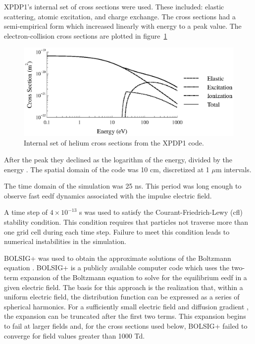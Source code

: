 XPDP1's internal set of cross sections were used. These included: elastic
scattering, atomic excitation, and charge exchange. The cross sections had a
semi-empirical form which increased linearly with energy to a peak value. The
electron-collision cross sections are plotted in figure~\ref{fig:xsecs}
\begin{figure}
  \centering
  \includegraphics{./chapters/modeling/figures/xsecs.eps}
  \caption{Internal set of helium cross sections from the XPDP1 code.}
  \label{fig:xsecs}
\end{figure}
After the peak they declined as the logarithm of the energy, divided by the
energy \cite{Verboncoeur1993}. The spatial domain of the code was 10 cm,
discretized at 1 $\mu$m intervals.

The time domain of the simulation was 25 ns.
This period was long enough to observe fast \acs{eedf} dynamics associated with
the impulse electric field.

A time step of $4\times10^{-13}$ s was used to
satisfy the Courant-Friedrich-Lewy (\acs{cfl}) stability condition. This
condition requires that particles not traverse more than one grid cell during
each time step. Failure to meet this condition leads to numerical instabilities
in the simulation.

BOLSIG+ was used to obtain the approximate solutions of the Boltzmann equation
\cite{Hagelaar2005}. BOLSIG+ is a publicly available computer code which uses
the two-term expansion of the Boltzmann equation to solve for the equilibrium
\acs{eedf} in a given electric field. The basis for this approach is the
realization that, within a uniform electric field, the distribution function can
be expressed as a series of spherical harmonics. For a sufficiently small
electric field and diffusion gradient \cite{Holstein1946}, the expansion can be
truncated after the first two terms. This expansion begins to fail at larger
fields \cite{Allis1982} and, for the cross sections used below, BOLSIG+ failed
to converge for field values greater than 1000 Td.

